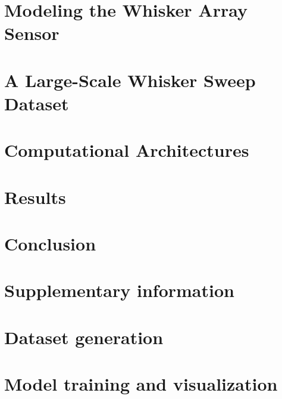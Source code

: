 \documentclass{article}
\newcommand{\beginsupplement}{%
	\setcounter{table}{0}
	\renewcommand{\thetable}{S\arabic{table}}%
	\setcounter{figure}{0}
	\renewcommand{\thefigure}{S\arabic{figure}}%
	\setcounter{section}{0}
	\renewcommand{\thesection}{\arabic{section}}%
}
\begin{document}
\section{Modeling the Whisker Array Sensor} %
\vspace{-4mm}

\vspace{-3mm}
\section{A Large-Scale Whisker Sweep Dataset} %
\vspace{-4mm}

\vspace{-3mm}
\section{Computational Architectures} %
\vspace{-4mm}

\vspace{-3mm}
\section{Results} %
\vspace{-4mm}

\vspace{-3mm}
\section{Conclusion}  %
\vspace{-4mm}


{\small
}



\section*{Supplementary information}
\beginsupplement
\appendix

\section{Dataset generation}


\section{Model training and visualization}

\end{document}
